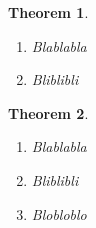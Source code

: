 \documentclass{article}
\newtheorem{thm}{Theorem}
\begin{document}
\begin{thm}
  \begin{enumerate}[series=thmenum]
  \item Blablabla
  \item Bliblibli
  \end{enumerate}
\end{thm}

\begin{thm}
  \begin{enumerate}[thmenum]
  \item Blablabla
  \item Bliblibli
  \item Blobloblo
  \end{enumerate}
\end{thm}
\end{document}
